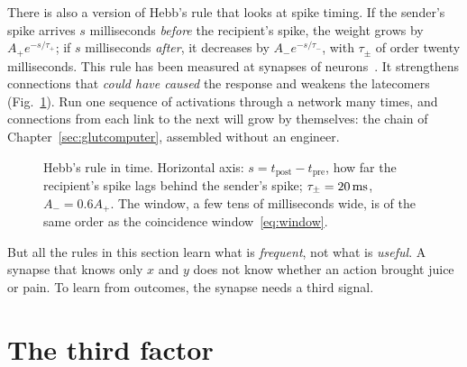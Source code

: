 There is also a version of Hebb's rule that looks at spike timing. If the sender's spike arrives $s$ milliseconds \emph{before} the recipient's spike, the weight grows by $A_+e^{-s/\tau_+}$; if $s$ milliseconds \emph{after}, it decreases by $A_-e^{-s/\tau_-}$, with $\tau_\pm$ of order twenty milliseconds. This rule has been measured at synapses of  neurons~\cite{BiPoo1998}. It strengthens connections that \emph{could have caused} the response and weakens the latecomers (Fig.~\ref{fig:stdp}). Run one sequence of activations through a network many times, and connections from each link to the next will grow by themselves: the chain of Chapter~\ref{sec:glutcomputer}, assembled without an engineer.

\begin{figure}[t]
\centering
{}
\caption{Hebb's rule in time. Horizontal axis: $s=t_{\text{post}}-t_{\text{pre}}$, how far the recipient's spike lags behind the sender's spike; $\tau_\pm=20\,\text{ms}$, $A_-=0.6A_+$. The window, a few tens of milliseconds wide, is of the same order as the coincidence window~\eqref{eq:window}.}
\label{fig:stdp}
\end{figure}

But all the rules in this section learn what is \emph{frequent}, not what is \emph{useful}. A synapse that knows only $x$ and $y$ does not know whether an action brought juice or pain. To learn from outcomes, the synapse needs a third signal.

\section{The third factor}

